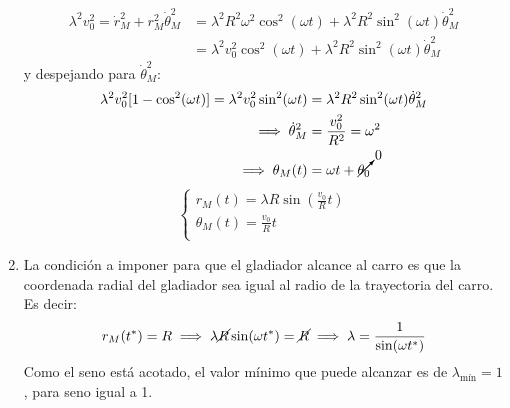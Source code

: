 \documentclass{article}
\begin{document}
\begin{enumerate}
    \begin{equation*}
        \begin{split}
            \lambda ^2 v_0^2 = \dot{r}_M^2+r_M^2 \dot{\theta }_M^2 &= \lambda ^2R^2\omega ^2 \cos ^2 (\omega t)+\lambda ^2 R^2 \sin^2 (\omega t) \dot{\theta }_M^2 \\
            &=\lambda ^2 v_0^2 \cos^2(\omega t)+\lambda ^2 R^2 \sin^2 (\omega t)\dot{\theta }_M^2
        \end{split}
    \end{equation*}
    y despejando para $\dot{\theta }_M^2$:
    \begin{equation*}
        \begin{split}
            \lambda^2 v_0^2[1-\cos^2(\omega t)]=\lambda ^2 v_0^2 \sin^2 (\omega t)&=\lambda ^2 R^2 \sin^2 (\omega t)\dot{\theta }_M^2\\
            \implies \dot{\theta }_M^2&=\frac{v_0^2}{R^2}=\omega ^2\\
            \implies \theta_M (t)&=\omega t + \cancelto{0}{\theta _0}
        \end{split}
    \end{equation*}
    $$
    \boxed{   
    \begin{cases}
        r_M(t)=\displaystyle{\lambda R \sin \left ( \frac{v_0}{R} t \right )}\\
        \theta_M(t)=\displaystyle{\frac{v_0}{R}} t\\
    \end{cases}
    }
    $$

    \item La condición a imponer para que el gladiador alcance al carro es que la coordenada radial del gladiador sea igual al radio de la trayectoria del carro. Es decir:
    $$
    r_M(t^*)=R\implies \lambda \cancel{R} \sin(\omega t^*)=\cancel{R}\implies \lambda = \frac{1}{\sin(\omega t^*)}
    $$
    Como el seno está acotado, el valor mínimo que puede alcanzar es de $\boxed{\lambda_\text{mín}=1}$, para seno igual a 1.


\end{enumerate}
\end{document}
